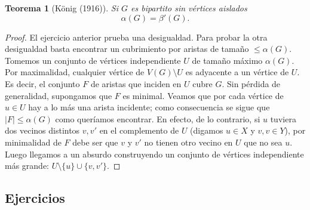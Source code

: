 \documentclass[12pt]{report}
\theoremstyle{plain}
\newtheorem{theorem}{Teorema}[section]
\theoremstyle{definition}
\newcommand{\abs}[1]{\left \vert #1 \right \vert}
\begin{document}
\begin{theorem}[König (1916)]\label{th:teorema de König - en todo grafo bipartito sin vertices aislados alpha = beta '}
Si $G$ es bipartito sin vértices aislados
\[
    \boxed{\alpha (G) = \beta ' (G) .}
\]
\end{theorem}
\begin{proof}
El ejercicio anterior prueba una desigualdad. Para probar la otra desigualdad basta encontrar un cubrimiento por aristas de tamaño $ \leq \alpha (G)$. Tomemos un conjunto de vértices independiente $U$ de tamaño máximo $\alpha (G)$. Por maximalidad, cualquier vértice de $V(G) \setminus U$ es adyacente a un vértice de $U$. Es decir, el conjunto $F$ de aristas que inciden en $U$ cubre $G$. Sin pérdida de generalidad, supongamos que $F$ es minimal. Veamos que por cada vértice de $u \in U$ hay a lo más una arista incidente; como consecuencia se sigue que $\abs F \leq \alpha (G)$ como queríamos encontrar. En efecto, de lo contrario, si $u$ tuviera dos vecinos distintos $v,v'$ en el complemento de $U$ (digamos $u \in X$ y $v,v \in Y$), por minimalidad de $F$ debe ser que $v$ y $v'$ no tienen otro vecino en $U$ que no sea $u$. Luego llegamos a un absurdo construyendo un conjunto de vértices independiente más grande: $U\setminus \{u\} \cup \{v,v'\}$.
\end{proof}




\subsection{Ejercicios}
\end{document}
